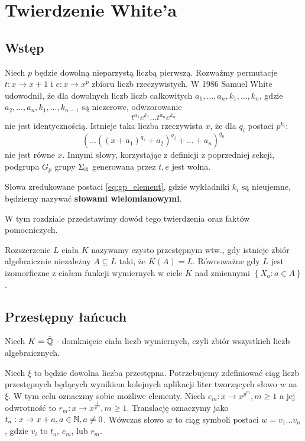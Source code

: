 \chapter{Twierdzenie White'a}
\label{ch:white_theorem}
\section{Wstęp}

Niech $p$ będzie dowolną nieparzystą liczbą pierwszą. Rozważmy permutacje $t :
x \rightarrow  x+1$ i $e: x \rightarrow x^p$ zbioru liczb rzeczywistych. W 1986
Samuel White \cite{whi88} udowodnił, że dla dowolnych liczb liczb całkowitych
$a_1, \ldots, a_n, k_1, \ldots, k_n$, gdzie $a_2, \ldots, a_n, k_1, \ldots,
k_{n-1}$ są niezerowe, odwzorowanie 
\begin{equation*}
  t^{a_1}e^{k_1}\ldots t^{a_n}e^{k_n}
\end{equation*}
nie jest identycznością. Istnieje taka liczba rzeczywista $x$, że dla $q_i$
postaci $p^{k_i}$:
\begin{equation}
  \left( \ldots \left(\left(x + a_1\right)^{q_1} + a_2\right)^{q_2} +
    \ldots + a_n\right)^{q_n}
\label{eq:gp_element}
\end{equation}
nie jest równe $x$. Innymi słowy, korzystając z definicji z poprzedniej sekcji,
podgrupa $G_p$ grupy $\Sigma_{\mathbb{R}}$ generowana przez $t, e$ jest wolna.

Słowa zredukowane postaci \ref{eq:gp_element}, gdzie wykładniki $k_i$ są
nieujemne, będziemy nazywać \textbf{słowami wielomianowymi}.

W tym rozdziale przedstawimy dowód tego twierdzenia oraz faktów pomocniczych.

\begin{defin}
  Rozszerzenie $L$ ciała $K$ nazywamy czysto przestępnym wtw., gdy istnieje
  zbiór algebraicznie niezależny $A \subseteq L$ taki, że $K(A) = L$. Równoważne
  gdy $L$ jest izomorficzne z ciałem funkcji wymiernych w ciele $K$ nad
  zmiennymi $\left\{X_a : a \in A\right\}$.
\end{defin}

\section{Przestępny łańcuch}
\label{sec:przelan}

Niech $K = \bar{\mathbb{Q}}$ - domknięcie ciała liczb wymiernych, czyli zbiór wszystkich
liczb algebraicznych.

Niech $\xi$ to będzie dowolna liczba przestępna. Potrzebujemy zdefiniować ciąg
liczb przestępnych będących wynikiem kolejnych aplikacji liter tworzących słowo
$w$ na $\xi$. W tym celu oznaczmy sobie możliwe elementy. Niech $e_m: x
\rightarrow x^{p^m}, m \geq 1$ a jej odwrotność to $r_m: x \rightarrow
x^{\frac{1}{p^m}}, m \geq 1$. Translację oznaczymy jako $t_a: x \rightarrow x +
a, a \in \mathbb{N}, a \neq 0$.  Wówczas słowo $w$ to ciąg symboli postaci $w =
v_1\ldots v_n$, gdzie $v_i$ to $t_a$, $e_m$, lub $r_m$. 

